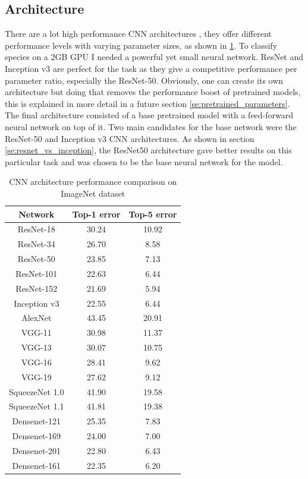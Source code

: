 \documentclass[times, utf8, diplomski]{fer}
\begin{document}
\subsection{Architecture}
\label{se:architecture}

There are a lot high performance CNN architectures \citep{he_deep_2016, simonyan_very_2014, szegedy_going_2015}, they offer different performance levels with varying parameter sizes, as shown in \ref{tb:CNN_architecutre_performance}. To classify species on a 2GB GPU I needed a powerful yet small neural network. ResNet and Inception v3 are perfect for the task as they give a competitive performance per parameter ratio, especially the ResNet-50. Obviously, one can create its own architecture but doing that removes the performance boost of pretrained models, this is explained in more detail in a future section \ref{se:pretrained_parameters}. The final architecture consisted of a base pretrained model with a feed-forward neural network on top of it. Two main candidates for the base network were the ResNet-50 and Inception v3 CNN architectures. As shown in section \ref{se:resnet_vs_inception}, the ResNet50 architecture gave better results on this particular task and was chosen to be the base neural network for the model.

\begin{table}
\centering
\caption{CNN architecture performance comparison on ImageNet dataset}
\label{tb:CNN_architecutre_performance}
\begin{tabular}{ccc}
\hline 
Network	& Top-1 error & Top-5 error \\  \hline
ResNet-18 & 30.24 & 10.92 \\
ResNet-34 & 26.70 & 8.58 \\ 
ResNet-50 & 23.85 & 7.13 \\ 
ResNet-101 & 22.63 & 6.44 \\ 
ResNet-152 & 21.69 & 5.94 \\  \hline
Inception v3 & 22.55 & 6.44 \\  \hline
AlexNet & 43.45 & 20.91 \\  \hline
VGG-11 & 30.98 & 11.37 \\ 
VGG-13 & 30.07 & 10.75 \\ 
VGG-16 & 28.41 & 9.62 \\ 
VGG-19 & 27.62 & 9.12 \\  \hline
SqueezeNet 1.0 & 41.90 & 19.58 \\ 
SqueezeNet 1.1 & 41.81 & 19.38 \\  \hline
Densenet-121 & 25.35 & 7.83 \\ 
Densenet-169 & 24.00 & 7.00 \\ 
Densenet-201 & 22.80 & 6.43 \\ 
Densenet-161 & 22.35 & 6.20 \\ 
\hline 
\end{tabular} 
\end{table}
\end{document}

